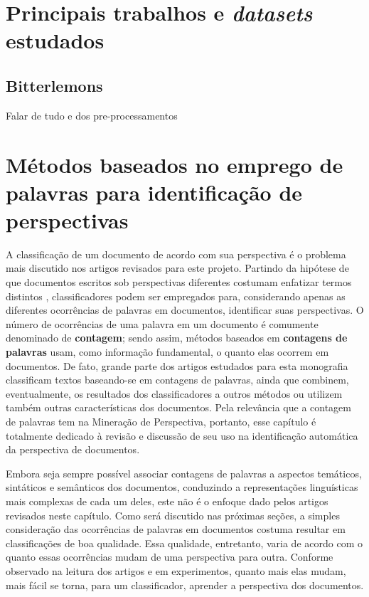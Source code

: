 \chapter{Principais trabalhos e \emph{datasets} estudados}

\section{Bitterlemons}
\label{bitter}

Falar de tudo e dos pre-processamentos

\chapter{Métodos baseados no emprego de palavras para identificação de perspectivas}
\label{chap3}

A classificação de um documento de acordo com sua perspectiva é o problema mais discutido nos artigos revisados para este projeto. Partindo da hipótese de que documentos escritos sob perspectivas diferentes costumam enfatizar termos distintos \cite{teubert}, classificadores podem ser empregados para, considerando apenas as diferentes ocorrências de palavras em documentos, identificar suas perspectivas. O número de ocorrências de uma palavra em um documento é comumente denominado de \textbf{contagem}; sendo assim, métodos baseados em \textbf{contagens de palavras} usam, como informação fundamental, o quanto elas ocorrem em documentos. De fato, grande parte dos artigos estudados para esta monografia classificam textos baseando-se em contagens de palavras, ainda que combinem, eventualmente, os resultados dos classificadores a outros métodos ou utilizem também outras características dos documentos. Pela relevância que a contagem de palavras tem na Mineração de Perspectiva, portanto, esse capítulo é totalmente dedicado à revisão e discussão de seu uso na identificação automática da perspectiva de documentos.

Embora seja sempre possível associar contagens de palavras a aspectos temáticos, sintáticos e semânticos dos documentos, conduzindo a representações linguísticas mais complexas de cada um deles, este não é o enfoque dado pelos artigos revisados neste capítulo. Como será discutido nas próximas seções, a simples consideração das ocorrências de palavras em documentos costuma resultar em classificações de boa qualidade. Essa qualidade, entretanto, varia de acordo com o quanto essas ocorrências mudam de uma perspectiva para outra. Conforme observado na leitura dos artigos e em experimentos, quanto mais elas mudam, mais fácil se torna, para um classificador, aprender a perspectiva dos documentos.  %

